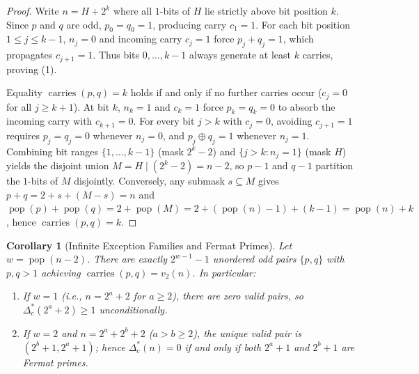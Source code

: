 \documentclass[11pt,a4paper]{article}
\newtheorem{corollary}[theorem]{Corollary}
\begin{document}
\begin{proof}
Write $n = H + 2^k$ where all $1$-bits of $H$ lie strictly above bit position $k$. Since $p$ and $q$ are odd, $p_0 = q_0 = 1$, producing carry $c_1 = 1$. For each bit position $1 \le j \le k - 1$, $n_j = 0$ and incoming carry $c_j = 1$ force $p_j + q_j = 1$, which propagates $c_{j+1} = 1$. Thus bits $0, \dots, k-1$ always generate at least $k$ carries, proving (1).

Equality $\operatorname{carries}(p, q) = k$ holds if and only if no further carries occur ($c_j = 0$ for all $j \ge k + 1$). At bit $k$, $n_k = 1$ and $c_k = 1$ force $p_k = q_k = 0$ to absorb the incoming carry with $c_{k+1} = 0$. For every bit $j > k$ with $c_j = 0$, avoiding $c_{j+1} = 1$ requires $p_j = q_j = 0$ whenever $n_j = 0$, and $p_j \oplus q_j = 1$ whenever $n_j = 1$. Combining bit ranges $\{1, \dots, k-1\}$ (mask $2^k - 2$) and $\{j > k : n_j = 1\}$ (mask $H$) yields the disjoint union $M = H \mathbin{|} (2^k - 2) = n - 2$, so $p - 1$ and $q - 1$ partition the $1$-bits of $M$ disjointly. Conversely, any submask $s \subseteq M$ gives $p + q = 2 + s + (M - s) = n$ and $\operatorname{pop}(p) + \operatorname{pop}(q) = 2 + \operatorname{pop}(M) = 2 + (\operatorname{pop}(n) - 1) + (k - 1) = \operatorname{pop}(n) + k$, hence $\operatorname{carries}(p, q) = k$.
\end{proof}

\begin{corollary}[Infinite Exception Families and Fermat Primes]
Let $w = \operatorname{pop}(n - 2)$. There are exactly $2^{w-1} - 1$ unordered odd pairs $\{p, q\}$ with $p, q > 1$ achieving $\operatorname{carries}(p, q) = v_2(n)$. In particular:
\begin{enumerate}
    \item If $w = 1$ (i.e., $n = 2^a + 2$ for $a \ge 2$), there are zero valid pairs, so $\Delta_c^*(2^a + 2) \ge 1$ unconditionally.
    \item If $w = 2$ and $n = 2^a + 2^b + 2$ ($a > b \ge 2$), the unique valid pair is $(2^b + 1, 2^a + 1)$; hence $\Delta_c^*(n) = 0$ if and only if both $2^a + 1$ and $2^b + 1$ are Fermat primes.
\end{enumerate}
\end{corollary}
\end{document}
